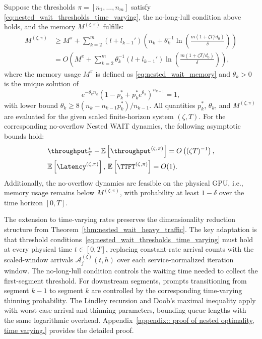 \begin{theorem}
\label{thm:nested_wait_heavy_traffic_time_varying}
Suppose the thresholds $\pi = [n_1, \dots, n_m]$ satisfy \eqref{eq:nested_wait_thresholds_time_varying}, the no-long-lull condition above holds, and the memory $M^{(\zeta,\pi)}$ fulfills:
\[
\begin{aligned}
M^{(\zeta,\pi)}
&\geq M^{\pi} + \sum_{k=2}^m (l + l_{k-1}') \left(n_k + \theta_k^{-1} \ln\!\left( \tfrac{m(1+\zeta T/d_0)}{\delta} \right)\right) \\
    &= O\!\left( M^\pi + \sum_{k=2}^m \theta_k^{-1}  (l + l_{k-1}') \ln\!\left( \tfrac{m(1+\zeta T/d_0)}{\delta} \right) \right),
\end{aligned}
\]
where the memory usage $M^\pi$ is defined as \eqref{eq:nested_wait_memory} and \(\theta_k>0\) is the unique solution of
\[
    e^{-\theta_k n_k}(1-p_k^*+p_k^*e^{\theta_k})^{n_{k-1}}=1,
\]
with lower bound \(\theta_k\ge 8(n_k-n_{k-1}p_k^*)/n_{k-1}\).
All quantities \(p_k^*\), \(\theta_k\), and \(M^{(\zeta,\pi)}\) are evaluated for the given scaled finite-horizon system \((\zeta,T)\).
For the corresponding no-overflow Nested WAIT dynamics, the following asymptotic bounds hold:
$$
    \begin{aligned}
        &\throughput_T^* - \mathbb{E}\left[ \throughput^{(\zeta, \pi)} \right]
   = O\left( (\zeta T)^{-1} \right), \\
&\mathbb{E}\left[ \Latency^{(\zeta, \pi)} \right], \,\mathbb{E}\left[ \TTFT^{(\zeta, \pi)} \right] = O(1).
    \end{aligned}
$$
Additionally, the no-overflow dynamics are feasible on the physical GPU, i.e., memory usage remains below $M^{(\zeta,\pi)}$, with probability at least $1 - \delta$ over the time horizon $[0,T].$
\end{theorem}

The extension to time-varying rates preserves the dimensionality reduction structure from Theorem~\ref{thm:nested_wait_heavy_traffic}. The key adaptation is that threshold conditions~\eqref{eq:nested_wait_thresholds_time_varying} must hold at every physical time \(t \in [0,T]\), replacing constant-rate arrival counts with the scaled-window arrivals \(\mathcal A_j^{(\zeta)}(t,h)\) over each service-normalized iteration window. The no-long-lull condition controls the waiting time needed to collect the first-segment threshold. For downstream segments, prompts transitioning from segment \(k-1\) to segment \(k\) are controlled by the corresponding time-varying thinning probability. The Lindley recursion and Doob's maximal inequality apply with worst-case arrival and thinning parameters, bounding queue lengths with the same logarithmic overhead. Appendix~\ref{appendix:: proof of nested optimality, time varying.} provides the detailed proof.

